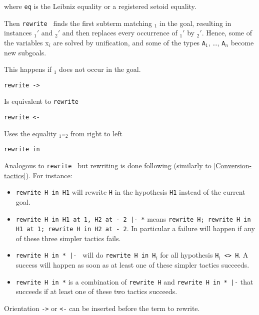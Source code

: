 \begin{coq_example*}
\noindent where \texttt{eq} is the Leibniz equality or a registered
setoid equality.

\noindent Then {\tt rewrite \term} finds the first subterm matching
\term$_1$ in the goal, resulting in instances \term$_1'$ and \term$_2'$
and then replaces every occurrence of \term$_1'$ by \term$_2'$.
Hence, some of the variables x$_i$ are
solved by unification, and some of the types \texttt{A}$_1$, \dots,
\texttt{A}$_n$ become new subgoals.


\begin{ErrMsgs}
\item {}

\item {}

This happens if \term$_1$ does not occur in the goal.
\end{ErrMsgs}

\begin{Variants}
\item {\tt rewrite -> \term}

  Is equivalent to {\tt rewrite \term}

\item {\tt rewrite <- \term}

  Uses the equality \term$_1${\tt=}\term$_2$ from right to left

\item {\tt rewrite {\term} in }

  Analogous to {\tt rewrite {\term}} but rewriting is done following
   (similarly to \ref{Conversion-tactics}). For
  instance:
  \begin{itemize}
  \item \texttt{rewrite H in H1} will rewrite \texttt{H} in the hypothesis
    \texttt{H1} instead of the current goal.
  \item \texttt{rewrite H in H1 at 1, H2 at - 2 |- *} means \texttt{rewrite H; rewrite H in H1 at 1;
      rewrite H in H2 at - 2}. In particular a failure will happen if any of
    these three simpler tactics fails.
  \item \texttt{rewrite H in * |- } will do \texttt{rewrite H in
      H$_i$} for all hypothesis \texttt{H$_i$ <> H}. A success will happen
    as soon as at least one of these simpler tactics succeeds.
  \item \texttt{rewrite H in *} is a combination of \texttt{rewrite H}
    and \texttt{rewrite H in * |-} that succeeds if at
    least one of these two tactics succeeds.
  \end{itemize}
  Orientation {\tt ->} or {\tt <-} can be
  inserted before the term to rewrite.


\end{Variants}
\end{coq_example*}
